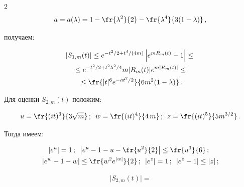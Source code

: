 \begin{multicols}{2}
$$


a=a(\lambda)=1-\fr{\lambda^2}{2} - \fr{\lambda^4}{3(1-\lambda)}\,,


$$ 


получаем:





\noindent


\begin{multline}


\left|S_{1,m}(t)\right| \leq  e^{-t^2/2+t^4/(4m)} \left|e^{m R_m(t)}-1\right| \leq {}\\


{} \leq  e^{-t^2/2+t^2\lambda^2/4} m|R_m(t)| e^{m |R_m(t)|} 


\leq{}\\


{}\leq  \fr{|t|^6 e^{-at^2/2}}{6m^2(1-\lambda)} \,.


\label{g8}


\end{multline}


%


 Для оценки $S_{2,m}(t)$ положим:


 $$


 u= \fr{(it)^3}{3\sqrt{m}}\,;\enskip


w= \fr{(it)^4}{4\,m}\,; \enskip z=\fr{(it)^5}{5m^{3/2}}\,.


$$  


Тогда имеем:





\noindent


\begin{gather*}


|e^u|= 1\,;\enskip \left|e^u-1-u-\fr{u^2}{2}\right|\leq \fr{u^3}{6}\,;\enskip\\[-1pt]


|e^w-1-w|\leq \fr{w^2e^{|w|}}{2}\,;\enskip |e^z|=1\,;\enskip |e^z - 1|\leq |z|\,;


\end{gather*}





\vspace*{-12pt}





\noindent


\begin{multline}


\big|S_{2,m}(t)\big|  ={}\\[-2pt]



\end{multline}
\end{multicols}
